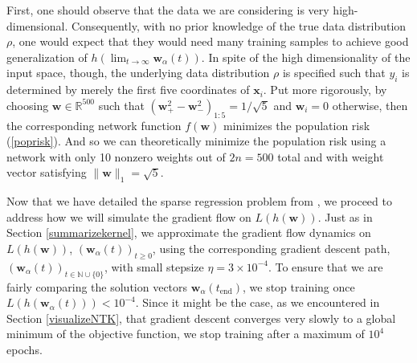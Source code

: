 \documentclass{article}
\begin{document}
First, one should observe that the data we are considering is very high-dimensional. Consequently, with no prior knowledge of the true data distribution $\rho$, one would expect that they would need many training samples to achieve good generalization of $h(\lim_{t \to \infty} \boldsymbol{w}_{\alpha}(t))$. In spite of the high dimensionality of the input space, though, the underlying data distribution $\rho$ is specified such that $y_i$ is determined by merely the first five coordinates of $\boldsymbol{x}_i$. Put more rigorously, by choosing  $\boldsymbol{w} \in \mathbb{R}^{500}$ such that $(\boldsymbol{w}_+^2 - \boldsymbol{w}_-^2)_{1:5} = 1/\sqrt{5}$ and $\boldsymbol{w}_i = 0$ otherwise, then the corresponding network function $f(\boldsymbol{w})$ minimizes the population risk (\ref{poprisk}). And so we can theoretically minimize the population risk using a network with only 10 nonzero weights out of $2n = 500$ total and with weight vector satisfying $\| \boldsymbol{w} \|_1 = \sqrt{5}$.

Now that we have detailed the sparse regression problem from \cite{woodworth2020kernel}, we proceed to address how we will simulate the gradient flow on $L(h(\boldsymbol{w}))$. Just as in Section \ref{summarizekernel}, we approximate the gradient flow dynamics on $L(h(\boldsymbol{w}))$, $(\boldsymbol{w}_{\alpha}(t))_{t \geq 0}$, using the corresponding gradient descent path, $(\boldsymbol{w}_{\alpha}(t))_{t \in \mathbb{N} \cup \{ 0\}}$, with small stepsize $\eta = 3 \times 10^{-4}$. To ensure that we are fairly comparing the solution vectors $\boldsymbol{w}_{\alpha}(t_{\text{end}})$, we stop training once $L(h(\boldsymbol{w}_{\alpha}(t))) < 10^{-4}$. Since it might be the case, as we encountered in Section \ref{visualizeNTK}, that gradient descent converges very slowly to a global minimum of the objective function, we stop training after a maximum of $10^4$ epochs. 
\end{document}
